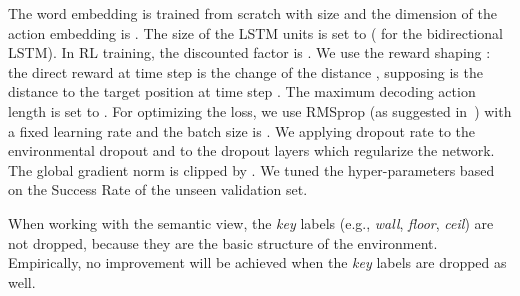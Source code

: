 \documentclass[11pt,a4paper]{article}
\begin{document}
The word embedding is trained from scratch with size  and the dimension of the action embedding is . 
The size of the LSTM units is set to  ( for the bidirectional LSTM).
In RL training, the discounted factor  is . 
We use the reward shaping \cite{wu2018building}: the direct reward  at time step  is the change of the distance , supposing  is the distance to the target position at time step . 
The maximum decoding action length is set to .
For optimizing the loss, we use RMSprop \cite{hinton2012neural} (as suggested in~) with a fixed learning rate  and the batch size is . 
We applying dropout rate  to the environmental dropout and  to the dropout layers which regularize the network.
The global gradient norm is clipped by . 
We tuned the hyper-parameters based on the Success Rate of the unseen validation set.

When working with the semantic view, the \emph{key} labels (e.g., \emph{wall}, \emph{floor}, \emph{ceil}) are not dropped, because they are the basic structure of the environment. Empirically, no improvement will be achieved when the \emph{key} labels are dropped as well. 
\end{document}
